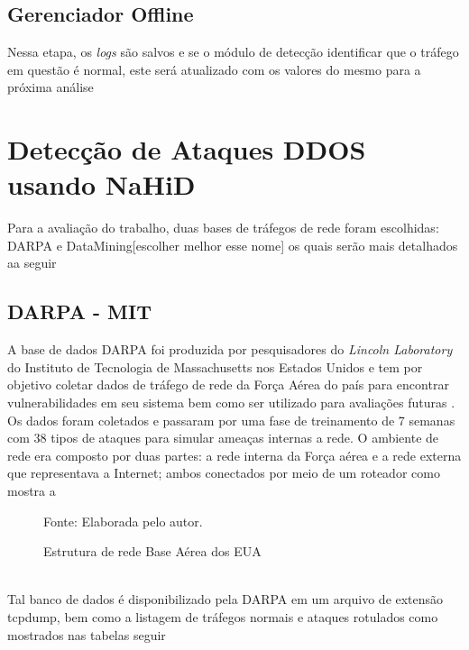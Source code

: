 \subsection{Gerenciador Offline}
Nessa etapa, os \textit{logs} são salvos e se o módulo de detecção identificar que o tráfego em questão é normal, este será atualizado com os valores do mesmo para a próxima análise

\section{Detecção de Ataques DDOS usando NaHiD}
\label{Sec:NaHiD_VERC}
Para a avaliação do trabalho, duas bases de tráfegos de rede foram escolhidas: DARPA e  DataMining[escolher melhor esse nome] os quais serão mais detalhados aa seguir 
\subsection{DARPA - MIT}
 A base de dados DARPA foi produzida por pesquisadores do \textit{Lincoln Laboratory} do Instituto de Tecnologia de Massachusetts nos Estados Unidos e tem por objetivo coletar dados de tráfego de rede da Força Aérea do país para encontrar vulnerabilidades em seu sistema bem como ser utilizado para avaliações futuras . Os dados foram coletados e passaram por uma fase de treinamento de 7 semanas com 38 tipos de ataques para simular ameaças internas a rede. O ambiente de rede era composto por duas partes: a rede interna da Força aérea e a rede externa que representava a Internet; ambos conectados por meio de um roteador como mostra a 
 \begin{figure}
	\caption{Estrutura de rede Base Aérea dos EUA }
	{Fonte: Elaborada pelo autor.}
	\label{fig:DARPA_Estrututra}
\end{figure}
\\
Tal banco de dados é disponibilizado pela DARPA em um arquivo de extensão tcpdump, bem como a listagem de tráfegos normais e ataques rotulados como mostrados nas tabelas seguir

